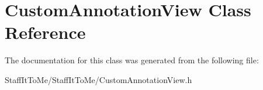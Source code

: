 \hypertarget{interface_custom_annotation_view}{
\section{\-Custom\-Annotation\-View \-Class \-Reference}
\label{interface_custom_annotation_view}
}


\-The documentation for this class was generated from the following file\-:\begin{DoxyCompactItemize}
\item 
\-Staff\-It\-To\-Me/\-Staff\-It\-To\-Me/\-Custom\-Annotation\-View.\-h\end{DoxyCompactItemize}
